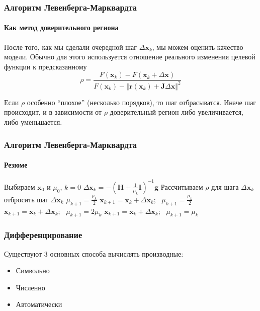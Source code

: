 \documentclass[notheorems,aspectratio=169]{beamer}
\begin{document}
\begin{frame}
  \frametitle{Алгоритм Левенберга-Марквардта}
  \framesubtitle{Как метод доверительного региона}
  После того, как мы сделали очередной шаг $\Delta\mathbf{x}_k$, мы можем оценить качество модели. Обычно для этого используется отношение реального изменения целевой функции к предсказанному
  \begin{equation*}
    \rho=\frac{F\left(\mathbf{x}_k\right)-F\left(\mathbf{x}_k+\Delta\mathbf{x}\right)}{F\left(\mathbf{x}_k\right)-\left\Vert\mathbf{r}\left(\mathbf{x}_k\right)+\mathbf{J}\Delta\mathbf{x}\right\Vert^2}
  \end{equation*}

  Если $\rho$ особенно ``плохое'' (несколько порядков), то шаг отбрасыватся. Иначе шаг происходит, и в зависимости от $\rho$ доверительный регион либо увеличивается, либо уменьшается.
\end{frame}

\begin{frame}
  \frametitle{Алгоритм Левенберга-Марквардта}
  \framesubtitle{Резюме}

\begin{algorithm}[H]
  \SetAlgoLined
  Выбираем $\mathbf{x}_0$ и $\mu_0$, $k=0$\;
  {
    $\Delta\mathbf{x}_k=-\left(\mathbf{H}+\frac{1}{\mu_k}\mathbf{I}\right)^{-1}\mathbf{g}$\;
    Рассчитываем $\rho$ для шага $\Delta\mathbf{x}_k$\;
    {
      отбросить шаг $\Delta\mathbf{x}_k$  $\mu_{k+1}=\frac{\mu_k}{2}$\;
    }
    {
      $\mathbf{x}_{k+1}=\mathbf{x}_k+\Delta\mathbf{x}_k;\,\,\,\, \mu_{k+1}=\frac{\mu_k}{2}$\;
    }
    {
      $\mathbf{x}_{k+1}=\mathbf{x}_k+\Delta\mathbf{x}_k;\,\,\,\, \mu_{k+1}=2\mu_k$\;
    }
    \Else
    {
      $\mathbf{x}_{k+1}=\mathbf{x}_k+\Delta\mathbf{x}_k;\,\,\,\, \mu_{k+1}=\mu_k$\;
    }
  }
\end{algorithm}

\end{frame}

\begin{frame}
  \frametitle{Дифференцирование}
  Существуют 3 основных способа вычислять производные:
  \begin{itemize}
    \item Символьно
    \item Численно
    \item Автоматически
  \end{itemize}
\end{frame}
\end{document}
